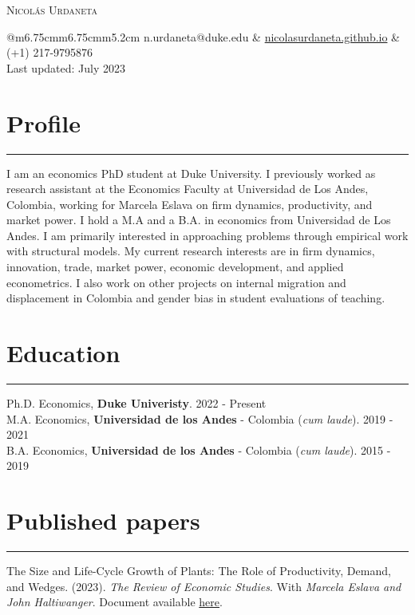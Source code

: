 \documentclass[12pt, letterpaper]{article}
\begin{document}
 

\begin{center}
{\Huge \textsc{Nicolás Urdaneta}}
\vspace*{5mm}

\begin{tabular}{@{}m{6.75cm}m{6.75cm}m{5.2cm}}
\noindent n.urdaneta@duke.edu & \href{nicolasurdaneta.github.io}{nicolasurdaneta.github.io} & (+1) 217-9795876 \\
Last updated: July 2023
\end{tabular}
\vspace*{-7mm}

\end{center}
\section*{Profile}
\vspace*{-8mm}
\noindent \rule{\linewidth}{0.2mm}
\noindent I am an economics PhD student at Duke University. I previously worked as research assistant at the Economics Faculty at Universidad de Los Andes, Colombia, working for Marcela Eslava on firm dynamics, productivity, and market power. I hold a M.A and a B.A. in economics from Universidad de Los Andes. I am primarily interested in approaching problems through empirical work with structural models. My current research interests are in firm dynamics, innovation, trade, market power, economic development, and applied econometrics. I also work on other projects on internal migration and displacement in Colombia and gender bias in student evaluations of teaching. 

\vspace*{-4mm}

\section*{Education}
\vspace*{-8mm}
\noindent \rule{\linewidth}{0.2mm}
\noindent
Ph.D. Economics, \textbf{Duke Univeristy}. \hfill 2022 - Present \\
M.A. Economics, \textbf{Universidad de los Andes} - Colombia (\textit{cum laude}). \hfill 2019 - 2021 \\
B.A. Economics, \textbf{Universidad de los Andes} - Colombia (\textit{cum laude}). \hfill 2015 - 2019

\vspace*{-2mm}

\section*{Published papers}
\vspace*{-8mm}
\noindent \rule{\linewidth}{0.2mm}
\noindent The Size and Life-Cycle Growth of Plants: The Role of Productivity, Demand, and Wedges. (2023). \textit{The Review of Economic Studies}.   With \textit{Marcela Eslava and John Haltiwanger}. Document available \href{https://academic.oup.com/restud/advance-article/doi/10.1093/restud/rdad029/7054272?login=true}{here}. 
\end{document}
